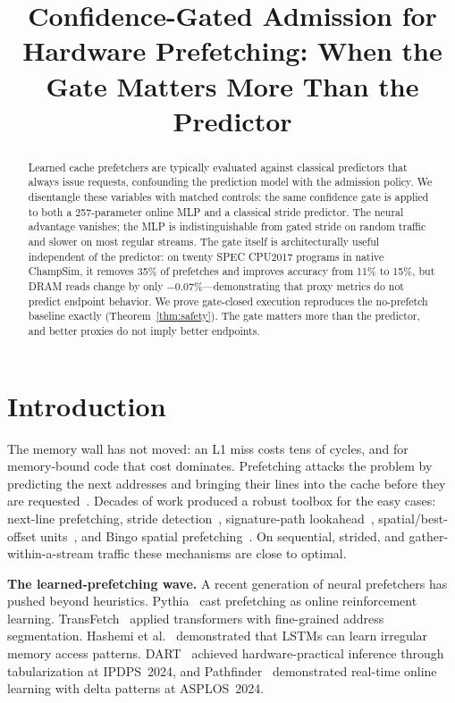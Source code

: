 \documentclass[sigplan,anonymous,review,nonacm]{acmart}
\begin{document}
\title{Confidence-Gated Admission for Hardware Prefetching: When the Gate Matters More Than the Predictor}

\begin{abstract}
Learned cache prefetchers are typically evaluated against classical
predictors that always issue requests, confounding the prediction model
with the admission policy. We disentangle these variables with matched
controls: the same confidence gate is applied to both a 257-parameter
online MLP and a classical stride predictor. The neural advantage
vanishes; the MLP is indistinguishable from gated stride on random
traffic and slower on most regular streams. The gate itself is
architecturally useful independent of the predictor: on twenty SPEC
CPU2017 programs in native ChampSim, it removes 35\% of prefetches and
improves accuracy from 11\% to 15\%, but DRAM reads change by only
$-0.07\%$---demonstrating that proxy metrics do not predict endpoint
behavior. We prove gate-closed execution reproduces the no-prefetch
baseline exactly (Theorem~\ref{thm:safety}). The gate matters more than
the predictor, and better proxies do not imply better endpoints.
\end{abstract}


\maketitle

\section{Introduction}
\label{sec:intro}

The memory wall has not moved: an L1 miss costs tens of cycles, and for
memory-bound code that cost dominates. Prefetching attacks the problem by
predicting the next addresses and bringing their lines into the cache before
they are requested~\cite{wulf1995,chen1995}. Decades of work produced a
robust toolbox for the easy cases: next-line prefetching, stride
detection~\cite{chen1995}, signature-path lookahead~\cite{kim2016spp},
spatial/best-offset units~\cite{michaud2016bop}, and Bingo spatial
prefetching~\cite{bingo}. On sequential, strided, and
gather-within-a-stream traffic these mechanisms are close to optimal.

\textbf{The learned-prefetching wave.}
A recent generation of neural prefetchers has pushed beyond heuristics.
Pythia~\cite{pythia} cast prefetching as online reinforcement learning.
TransFetch~\cite{transfetch} applied transformers with fine-grained address
segmentation. Hashemi et al.~\cite{hashemi2018} demonstrated that LSTMs
can learn irregular memory access patterns.
DART~\cite{dart} achieved hardware-practical inference through
tabularization at IPDPS~2024, and Pathfinder~\cite{pathfinder} demonstrated
real-time online learning with delta patterns at ASPLOS~2024.
\end{document}
